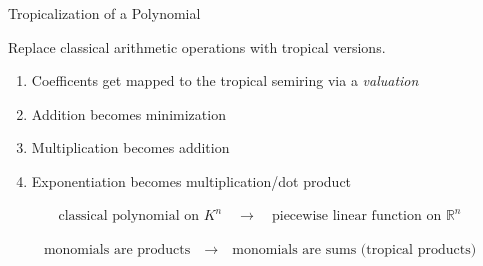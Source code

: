 \documentclass{beamer}
\DeclareMathOperator{\val}{val}
\DeclareMathOperator{\trop}{trop}
\newcommand{\R}{\ensuremath{\mathbb{R}}}
\newcommand{\N}{\ensuremath{\mathbb{N}}}
\begin{document}
\begin{frame}{Tropicalization of a Polynomial}


    Replace classical arithmetic operations with tropical versions.
    \begin{enumerate}
        \item Coefficents get mapped to the tropical semiring via a \textit{valuation}
        \item Addition becomes minimization
        \item Multiplication becomes addition
        \item Exponentiation becomes multiplication/dot product
    \end{enumerate}

	\pause
	\begin{align}
	    \text{classical polynomial on } K^n \quad \rightarrow \quad \text{piecewise linear function on } \R^n
	\end{align}
	
	\pause
	\begin{align}
		\text{monomials are products} \quad \rightarrow \quad \text{monomials are sums (tropical products)}
	\end{align}
\end{frame}
\end{document}
